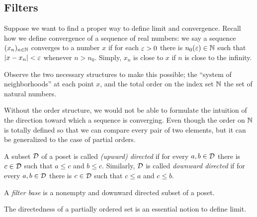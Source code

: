 \documentclass{../crs}
\begin{document}
\subsection{Filters}
Suppose we want to find a proper way to define limit and convergence.
Recall how we define convergence of a sequence of real numbers: we say a sequence $(x_n)_{n\in\mathbb{N}}$ converges to a number $x$ if for each $\varepsilon>0$ there is $n_0(\varepsilon)\in\mathbb{N}$ such that $|x-x_n|<\varepsilon$ whenever $n>n_0$.
Simply, $x_n$ is close to $x$ if $n$ is close to the infinity.

Observe the two necessary structures to make this possible; the ``system of neighborhoods'' at each point $x$, and the total order on the index set $\mathbb{N}$ the set of natural numbers.

Without the order structure, we would not be able to formulate the intuition of the direction toward which a sequence is converging.
Even though the order on $\mathbb{N}$ is totally defined so that we can compare every pair of two elements, but it can be generalized to the case of partial orders.

\begin{defn}
A subset $\mathcal{D}$ of a poset is called \emph{(upward) directed} if for every $a,b\in\mathcal{D}$ there is $c\in\mathcal{D}$ such that $a\le c$ and $b\le c$.
Similarly, $\mathcal{D}$ is called \emph{downward directed} if for every $a,b\in\mathcal{D}$ there is $c\in\mathcal{D}$ such that $c\le a$ and $c\le b$.
\end{defn}
\begin{defn}
A \emph{filter base} is a nonempty and downward directed subset of a poset.
\end{defn}
The directedness of a partially ordered set is an essential notion to define limit.
\end{document}
